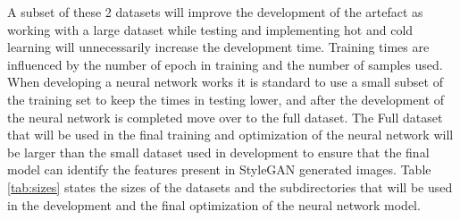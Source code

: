 A subset of these 2 datasets will improve the development of the artefact as working with a large dataset while testing and implementing hot and cold learning will unnecessarily increase the development time. Training times are influenced by the number of epoch in training and the number of samples used. When developing a neural network works it is standard to use a small subset of the training set to keep the times in testing lower, and after the development of the neural network is completed move over to the full dataset. The Full dataset that will be used in the final training and optimization of the neural network will be larger than the small dataset used in development to ensure that the final model can identify the features present in StyleGAN generated images. Table \ref{tab:sizes} states the sizes of the datasets and the subdirectories that will be used in the development and the final optimization of the neural network model. 

\begin{table}[H]
\caption{Total amount of images used in the Artefact creation}
\label{tab:sizes}
\end{table}


